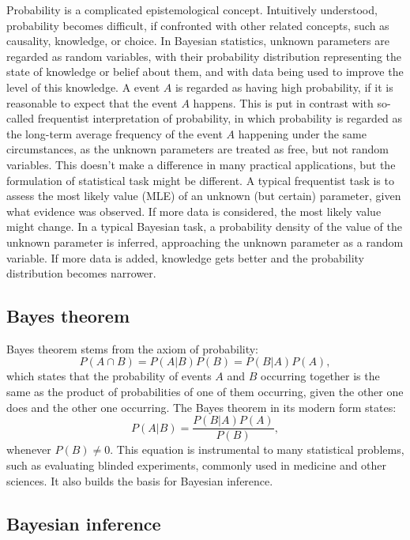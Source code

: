 Probability is a complicated epistemological concept. Intuitively understood, probability becomes difficult, if confronted with other related concepts, such as causality, knowledge, or choice. In Bayesian statistics, unknown parameters are regarded as random variables, with their probability distribution representing the state of knowledge or belief about them, and with data being used to improve the level of this knowledge. A event $A$ is regarded as having high probability, if it is reasonable to expect that the event $A$ happens. This is put in contrast with so-called frequentist interpretation of probability, in which probability is regarded as the long-term average frequency of the event $A$ happening under the same circumstances, as the unknown parameters are treated as free, but not random variables. This doesn't make a difference in many practical applications, but the formulation of statistical task might be different. A typical frequentist task is to assess the most likely value (MLE) of an unknown (but certain) parameter, given what evidence was observed. If more data is considered, the most likely value might change. In a typical Bayesian task, a probability density of the value of the unknown parameter is inferred, approaching the unknown parameter as a random variable. If more data is added, knowledge gets better and the probability distribution becomes narrower.

\subsection{Bayes theorem}

Bayes theorem stems from the axiom of probability:
\begin{equation}
    P(A \cap B) = P(A|B)P(B) = P(B|A)P(A),
\end{equation}
which states that the probability of events $A$ and $B$ occurring together is the same as the product of probabilities of one of them occurring, given the other one does and the other one occurring. The Bayes theorem  \citep{bayes1763essay} in its modern form states:
\begin{equation}
    P(A|B) = \frac{P(B|A)P(A)}{P(B)},
    \label{eq:bayes_theorem}
\end{equation}
whenever $P(B) \neq 0$. This equation is instrumental to many statistical problems, such as evaluating blinded experiments, commonly used in medicine and other sciences. It also builds the basis for Bayesian inference.

\subsection{Bayesian inference}

